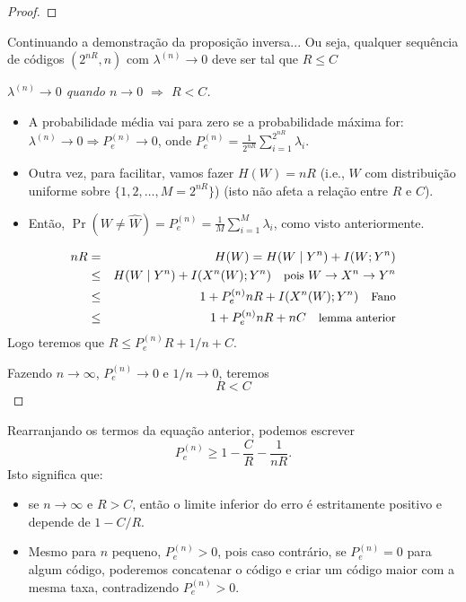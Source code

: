 \begin{frame}[allowframebreaks]
\begin{proof}
  \end{proof}
 
  \framebreak

  Continuando a demonstração da proposição inversa...
  Ou seja, qualquer sequência de códigos $(2^{nR},n)$ com $\lambda^{(n)} \rightarrow 0$ deve ser tal que $R \leq C$
  \begin{proof}[$\lambda^{(n)} \rightarrow 0$ quando $n \rightarrow 0$ $\Rightarrow$ $R < C$]
  \begin{itemize}
  \item A probabilidade média vai para zero se a probabilidade máxima for:
	$\lambda^{(n)} \rightarrow 0 \Rightarrow P_{e}^{(n)} \rightarrow 0$, onde $P_{e}^{(n)} = \frac{1}{2^{nR}} \sum_{i=1}^{2^{nR}} \lambda_i$.
  \item Outra vez, para facilitar, vamos fazer $H(W) = nR$ (i.e., $W$ com distribuição uniforme sobre $\{1,2,\ldots, M=2^{nR}\}$)
	(isto não afeta a relação entre $R$ e $C$).
  \item Então, $\Pr(W \neq \hat{W}) = P_e^{(n)} = \frac{1}{M} \sum_{i=1}^M \lambda_i$, como visto anteriormente.
  \end{itemize}

  \proofbreak

  \begin{eqnarray}
  nR &=& H(W) = H(W \mid Y^n) + I(W; Y^n) \\
	&\leq& H(W \mid Y^n) + I(X^n(W);Y^n) \quad \text{\small pois } W \rightarrow X^n \rightarrow Y^n \nonumber \\
	&\leq& 1 + P_e^{(n)} nR + I(X^n(W);Y^n)	\quad \text{\small Fano} \nonumber \\
	&\leq& 1 + P_e^{(n)} nR + nC \quad \text{\small lemma anterior} 
  \end{eqnarray}
  Logo teremos que $R \leq P_e^{(n)} R + 1/n +C$.

  Fazendo $n \rightarrow \infty$, $P_e^{(n)} \rightarrow 0$ e $1/n \rightarrow 0$, teremos 
	\begin{equation}
	R < C
	\end{equation}
  \end{proof}

  \framebreak
  
  Rearranjando os termos da equação anterior, podemos escrever
  \begin{equation}
   P_e^{(n)} \geq 1 - \frac{C}{R} - \frac{1}{nR} .
  \end{equation}
  Isto significa que:
  \begin{itemize}
  \item se $n \rightarrow \infty$ e $R>C$, então o limite inferior do erro é estritamente positivo e depende de $1 - C/R$.
  \item Mesmo para $n$ pequeno, $P_e^{(n)} > 0$, pois caso contrário, se $P_e^{(n)} = 0$ para algum código,
	poderemos concatenar o código e criar um código maior com a mesma taxa, contradizendo $P_e^{(n)} > 0$.
  \end{itemize}


\end{frame}
